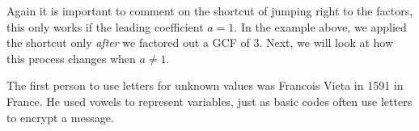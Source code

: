 Again it is important to comment on the shortcut of jumping right to the factors, this only works if the leading coefficient $a=1$. In the example above, we applied the shortcut only \textit{after} we factored out a GCF of 3.  Next, we will look at how this process changes when $a\neq1$.\pp

{} The first person to use letters for unknown
values was Francois Vieta in 1591 in France. He used vowels to represent
variables, just as basic codes often use letters to encrypt a message.
